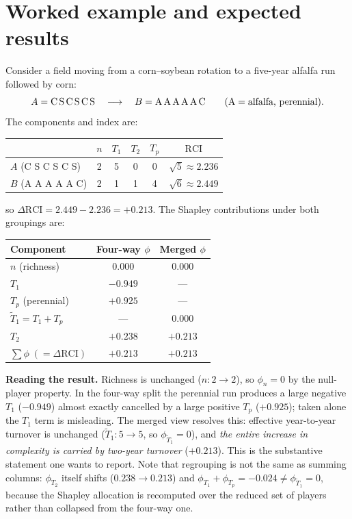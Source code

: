 \documentclass[11pt]{article}
\newcommand{\RCI}{\mathrm{RCI}}
\begin{document}
\section{Worked example and expected results}

Consider a field moving from a corn--soybean rotation to a five-year alfalfa
run followed by corn:
\[
A=\text{C\,S\,C\,S\,C\,S}\quad\longrightarrow\quad B=\text{A\,A\,A\,A\,A\,C}
\qquad(\text{A}=\text{alfalfa, perennial}).
\]
The components and index are:
\begin{center}
\begin{tabular}{lccccc}
\toprule
 & $n$ & $T_1$ & $T_2$ & $T_p$ & $\RCI$ \\
\midrule
$A$ (C S C S C S) & 2 & 5 & 0 & 0 & $\sqrt5\approx2.236$ \\
$B$ (A A A A A C) & 2 & 1 & 1 & 4 & $\sqrt6\approx2.449$ \\
\bottomrule
\end{tabular}
\end{center}
so $\Delta\RCI = 2.449-2.236 = +0.213$. The Shapley contributions under both
groupings are:
\begin{center}
\begin{tabular}{lcc}
\toprule
Component & Four-way $\phi$ & Merged $\phi$ \\
\midrule
$n$ (richness)              & $0.000$  & $0.000$ \\
$T_1$                       & $-0.949$ & --- \\
$T_p$ (perennial)           & $+0.925$ & --- \\
$\tilde T_1=T_1+T_p$        & ---      & $0.000$ \\
$T_2$                       & $+0.238$ & $+0.213$ \\
\midrule
$\sum\phi\;(=\Delta\RCI)$   & $+0.213$ & $+0.213$ \\
\bottomrule
\end{tabular}
\end{center}

\medskip
\noindent\textbf{Reading the result.} Richness is unchanged ($n:2\to2$), so
$\phi_n=0$ by the null-player property. In the four-way split the perennial run
produces a large negative $T_1$ ($-0.949$) almost exactly cancelled by a large
positive $T_p$ ($+0.925$); taken alone the $T_1$ term is misleading. The merged
view resolves this: effective year-to-year turnover is unchanged
($\tilde T_1:5\to5$, so $\phi_{\tilde T_1}=0$), and \emph{the entire increase in
complexity is carried by two-year turnover} ($+0.213$). This is the substantive
statement one wants to report. Note that regrouping is not the same as summing
columns: $\phi_{T_2}$ itself shifts ($0.238\!\to\!0.213$) and
$\phi_{T_1}+\phi_{T_p}=-0.024\neq\phi_{\tilde T_1}=0$, because the Shapley
allocation is recomputed over the reduced set of players rather than collapsed
from the four-way one.
\end{document}
